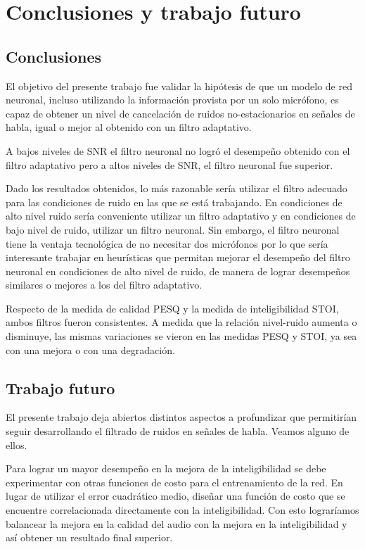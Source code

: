 \section{Conclusiones y trabajo futuro}

\subsection{Conclusiones}

El objetivo del presente trabajo fue validar la hipótesis de que un modelo de red neuronal, incluso utilizando la información provista por un solo micrófono, es capaz de obtener un nivel de cancelación de ruidos no-estacionarios en señales de habla, igual o mejor al obtenido con un filtro adaptativo.

A bajos niveles de SNR el filtro neuronal no logró el desempeño obtenido con el filtro adaptativo pero a altos niveles de SNR, el filtro neuronal fue superior.

Dado los resultados obtenidos, lo más razonable sería utilizar el filtro adecuado para las condiciones de ruido en las que se está trabajando. En condiciones de alto nivel ruido sería conveniente utilizar un filtro adaptativo y en condiciones de bajo nivel de ruido, utilizar un filtro neuronal. Sin embargo, el filtro neuronal tiene la ventaja tecnológica de no necesitar dos micrófonos por lo que sería interesante trabajar en heurísticas que permitan mejorar el desempeño del filtro neuronal en condiciones de alto nivel de ruido, de manera de lograr desempeños similares o mejores a los del filtro adaptativo.

Respecto de la medida de calidad PESQ y la medida de inteligibilidad STOI, ambos filtros fueron consistentes. A medida que la relación nivel-ruido aumenta o disminuye, las mismas variaciones se vieron en las medidas PESQ y STOI, ya sea con una mejora o con una degradación.

\subsection{Trabajo futuro}

El presente trabajo deja abiertos distintos aspectos a profundizar que permitirían seguir desarrollando el filtrado de ruidos en señales de habla. Veamos alguno de ellos.

Para lograr un mayor desempeño en la mejora de la inteligibilidad se debe experimentar con otras funciones de costo para el entrenamiento de la red. En lugar de utilizar el error cuadrático medio, diseñar una función de costo que se encuentre correlacionada directamente con la inteligibilidad. Con esto lograríamos balancear la mejora en la calidad del audio con la mejora en la inteligibilidad y así obtener un resultado final superior.

